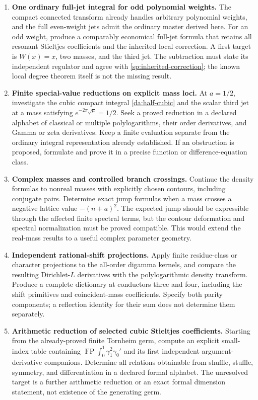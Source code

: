 \documentclass[11pt,letterpaper]{article}
\numberwithin{equation}{section}
\theoremstyle{definition}
\theoremstyle{remark}
\DeclareMathOperator{\FP}{FP}
\begin{document}
\begin{enumerate}[label=\textbf{Q\arabic*.}]
\item \textbf{One ordinary full-jet integral for odd polynomial weights.}
The compact connected transform already handles arbitrary polynomial
weights, and the full even-weight jets admit the ordinary master derived
here. For an odd weight, produce a comparably economical full-jet formula
that retains all resonant Stieltjes coefficients and the inherited local
correction. A first target is \(W(x)=x\), two masses, and the third jet.
The subtraction must state its independent regulator and agree with
\eqref{sp:inherited-correction}; the known local degree theorem itself is
not the missing result.

\item \textbf{Finite special-value reductions on explicit mass loci.}
At \(a=1/2\), investigate the cubic compact integral
\eqref{da:half-cubic} and the scalar third jet at a mass satisfying
\(e^{-2\pi\sqrt\mu}=1/2\). Seek a proved reduction in a declared alphabet
of classical or multiple polylogarithms, their order derivatives, and
Gamma or zeta derivatives. Keep a finite evaluation separate from the
ordinary integral representation already established. If an obstruction
is proposed, formulate and prove it in a precise function or
difference-equation class.

\item \textbf{Complex masses and controlled branch crossings.}
Continue the density formulas to nonreal masses with explicitly chosen
contours, including conjugate pairs. Determine exact jump formulas when a
mass crosses a negative lattice value \(- (n+a)^2\). The expected jump
should be expressible through the affected finite spectral terms, but
the contour deformation and spectral normalization must be proved
compatible. This would extend the real-mass results to a useful complex
parameter geometry.

\item \textbf{Independent rational-shift projections.}
Apply finite residue-class or character projections to the all-order
digamma kernels, and compare the resulting Dirichlet-\(L\) derivatives
with the polylogarithmic density transform. Produce a complete dictionary
at conductors three and four, including the shift primitives and
coincident-mass coefficients. Specify both parity components; a
reflection identity for their sum does not determine them separately.

\item \textbf{Arithmetic reduction of selected cubic Stieltjes coefficients.}
Starting from the already-proved finite Tornheim germ, compute an explicit
small-index table containing
\(\FP\int_0^1\gamma_1^2\gamma_0'\) and its first independent
argument-derivative companions. Determine all relations obtainable from
shuffle, stuffle, symmetry, and differentiation in a declared formal
alphabet. The unresolved target is a further arithmetic reduction or an
exact formal dimension statement, not existence of the generating germ.


\end{enumerate}
\end{document}
